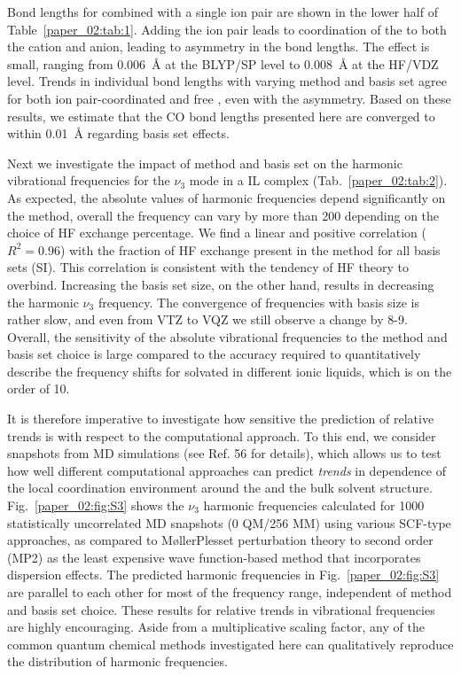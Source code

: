 Bond lengths for  combined with a single ion pair are shown in the lower half of Table~\ref{paper_02:tab:1}. Adding the ion pair leads to coordination of the  to both the cation and anion, leading to asymmetry in the  bond lengths. The effect is small, ranging from \SI{0.006}{\angstrom} at the BLYP/SP level to \SI{0.008}{\angstrom} at the HF/VDZ level. Trends in individual  bond lengths with varying method and basis set agree for both ion pair-coordinated  and free , even with the asymmetry. Based on these results, we estimate that the CO bond lengths presented here are converged to within \SI{0.01}{\angstrom} regarding basis set effects.

Next we investigate the impact of method and basis set on the harmonic vibrational frequencies for the \(\nu_{3}\) mode in a \textendash{}IL complex (Tab.~\ref{paper_02:tab:2}). As expected, the absolute values of harmonic frequencies depend significantly on the method, overall the frequency can vary by more than \SI{200}{\wavenumber} depending on the choice of HF exchange percentage. We find a linear and positive correlation (\(R^{2} = 0.96\)) with the fraction of HF exchange present in the method for all basis sets (SI). This correlation is consistent with the tendency of HF theory to overbind. Increasing the basis set size, on the other hand, results in decreasing the harmonic  \(\nu_{3}\) frequency. The convergence of frequencies with basis size is rather slow, and even from VTZ to VQZ we still observe a change by \num{8}-\SI{9}{\wavenumber}. Overall, the sensitivity of the absolute vibrational frequencies to the method and basis set choice is large compared to the accuracy required to quantitatively describe the frequency shifts for  solvated in different ionic liquids, which is on the order of \SI{10}{\wavenumber}.

It is therefore imperative to investigate how sensitive the prediction of relative trends is with respect to the computational approach. To this end, we consider snapshots from MD simulations (see Ref. 56 for details), which allows us to test how well different computational approaches can predict \emph{trends} in dependence of the local coordination environment around the  and the bulk solvent structure. Fig.~\ref{paper_02:fig:S3} shows the  \(\nu_{3}\) harmonic frequencies calculated for \num{1000} statistically uncorrelated MD snapshots (0 QM/256 MM) using various SCF-type approaches, as compared to M\o{}ller\textendash{}Plesset perturbation theory to second order (MP2) as the least expensive wave function-based method that incorporates dispersion effects.\cite{WCMS:WCMS58} The predicted harmonic frequencies in Fig.~\ref{paper_02:fig:S3} are parallel to each other for most of the frequency range, independent of method and basis set choice. These results for relative trends in vibrational frequencies are highly encouraging. Aside from a multiplicative scaling factor, any of the common quantum chemical methods investigated here can qualitatively reproduce the distribution of harmonic frequencies.

